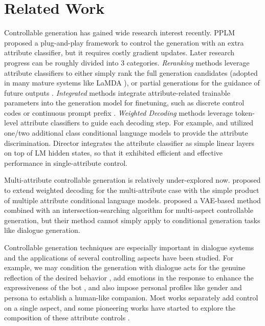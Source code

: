 \section{Related Work}

Controllable generation has gained wide research interest recently. PPLM \citep{dathathri2019plug} proposed a plug-and-play framework to control the generation with an extra attribute classifier, but it requires costly gradient updates. Later research progress can be roughly divided into 3 categories. \textit{Reranking} methods leverage attribute classifiers to either simply rank the full generation candidates (adopted in many mature systems like LaMDA \citep{thoppilan2022lamda}), or partial generations for the guidance of future outputs \citep{yang2021fudge}. \textit{Integrated} methods integrate attribute-related trainable parameters into the generation model for finetuning, such as discrete control codes \citep{keskar2019ctrl} or continuous prompt prefix \citep{qian2022controllable}. \textit{Weighted Decoding} methods leverage token-level attribute classifiers to guide each decoding step. For example, \citet{krause2021gedi} and \citet{liu2021dexperts} utilized one/two additional class conditional language models to provide the attribute discrimination. Director \citep{arora2022director} integrates the attribute classifier as simple linear layers on top of LM hidden states, so that it exhibited efficient and effective performance in single-attribute control.  

Multi-attribute controllable generation is relatively under-explored now. \citet{lin2021plug} proposed to extend weighted decoding for the multi-attribute case with the simple product of multiple attribute conditional language models. \citet{gu2022distributional} proposed a VAE-based method combined with an intersection-searching algorithm for multi-aspect controllable generation, but their method cannot simply apply to conditional generation tasks like dialogue generation. 

Controllable generation techniques are especially important in dialogue systems and the applications of several controlling aspects have been studied. For example, we may condition the generation with dialogue acts for the genuine reflection of the desired behavior \citep{wen2015semantically}, add emotions in the response to enhance the expressiveness of the bot \citep{zhou2018emotional}, and also impose personal profiles like gender \citep{su2020stylistic} and persona \citep{zhang2018personalizing} to establish a human-like companion. Most works separately add control on a single aspect, and some pioneering works have started to explore the composition of these attribute controls \citep{chen2022cped}. 

